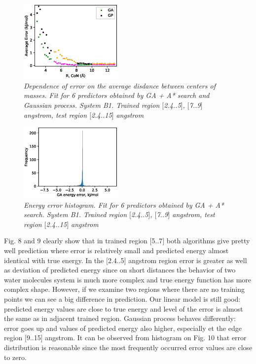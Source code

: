 \documentclass[aps,prl,reprint,amsmath,amssymb,nature]{revtex4-1}
\begin{document}
\begin{figure}[h]
\centering
\includegraphics[width=0.45\textwidth]{media/B1_gap_Error_6_predictors.eps}
\caption{\textit{Dependence of error on the average disdance between centers of masses. Fit for 6 predictors obtained by GA + A* search and Gaussian process. System B1. Trained region $[$2.4..5$]$, 
$[$7..9$]$ angstrom, test region $[$2.4..15$]$ angstrom}}\label{Fig:B1_gap_RMSE_6_predictors}
\end{figure}

\begin{figure}[h]
\includegraphics[width=0.45\textwidth]{media/B1_gap_GA_energy_error_histogram_6_predictors.eps}
\caption{\textit{Energy error histogram. Fit for 6 predictors obtained by GA + A* search. System B1. Trained region $[$2.4..5$]$, 
$[$7..9$]$ angstrom, test region $[$2.4..15$]$ angstrom}}\label{Fig:B1_gap_histogram_6_predictors}
\end{figure}


Fig. 8 and 9 clearly show that in trained region $[$5..7$]$ both 
algorithms give pretty well prediction where error is relatively small 
and predicted energy almost identical with true energy. In the 
$[$2.4..5$]$ angstrom region error is greater as well as deviation of 
predicted energy since on short distances the behavior of two water 
molecules system is much more complex and true energy function has more 
complex shape. However, if we examine two regions where there are no 
training points we can see a big difference in prediction. Our linear 
model is still good: predicted energy values are close to true energy 
and level of the error is almost the same as in adjacent trained region. 
Gaussian process behaves differently: error goes up and values of 
predicted energy also higher, especially et the edge region $[$9..15$]$ 
angstrom. It can be observed from histogram on Fig. 10 that error 
distribution is reasonable since the most frequently occurred error 
values are close to zero.
\end{document}
